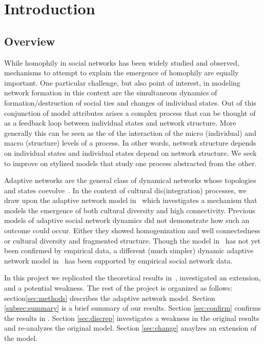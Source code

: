 \section{Introduction}
\subsection{Overview}\label{subsec:overview}
    While homophily in social networks has been widely studied and observed,
    mechanisms to
    attempt to explain the emergence of homophily are equally important.
    One particular challenge, but also point of interest, in modeling
    network formation in this context are the simultaneous dynamics of
    formation/destruction of social ties and changes of individual states.
    Out of this conjunction of model attributes arises a complex process that can
    be thought of as a feedback loop between individual states and network structure.
    More generally this can be seen as the of the interaction of
    the micro (individual) and macro (structure) levels of a process.
    In other words, network structure depends on individual states and individual
    states depend on network structure.
    We seek to improve on stylized models that study one process abstracted from the other.

    Adaptive networks are the general class of dynamical networks whose topologies
    and states coevolve~\citep{sayama2013modeling}.
    In the context of cultural dis(integration) processes, we draw upon the
    adaptive network model in~\citep{social-frag} which investigates a mechanism that models the emergence of
    both cultural diversity and high connectivity.
    Previous models of adaptive social network dynamics did not demonstrate how
    such an outcome could occur.
    Either they showed homogenization and well connectedness or cultural diversity and
    fragmented structure.
    Though the model in~\citep{social-frag} has not yet been confirmed by empirical
    data, a different (much simpler) dynamic adaptive network model in~\citep{brot2012feedback}
    has been supported by empirical social network data.

    In this project we replicated the theoretical results in~\citep{social-frag},
    investigated an extension, and a potential weakness.
    The rest of the project is organized as follows: section\ref{sec:methods} describes
    the adaptive network model.
    Section \ref{subsec:summary} is a brief summary of our results.
    Section \ref{sec:confirm} confirms the results in \citep{social-frag}.
    Section \ref{sec:discrep} investigates a weakness in the original results
    and re-analyzes the original model.
    Section \ref{sec:change} anaylzes an extension of the model.

